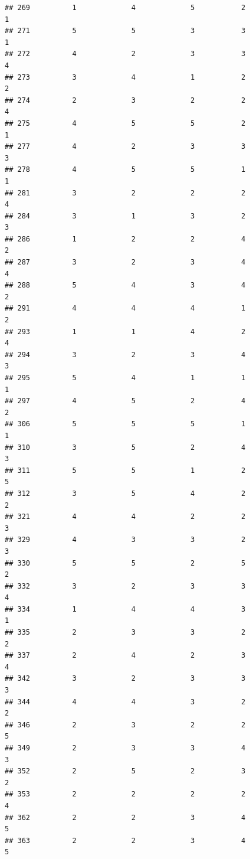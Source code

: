 \documentclass[
]{article}
\begin{document}
\begin{verbatim}
## 269          1             4             5           2             1
## 271          5             5             3           3             1
## 272          4             2             3           3             4
## 273          3             4             1           2             2
## 274          2             3             2           2             4
## 275          4             5             5           2             1
## 277          4             2             3           3             3
## 278          4             5             5           1             1
## 281          3             2             2           2             4
## 284          3             1             3           2             3
## 286          1             2             2           4             2
## 287          3             2             3           4             4
## 288          5             4             3           4             2
## 291          4             4             4           1             2
## 293          1             1             4           2             4
## 294          3             2             3           4             3
## 295          5             4             1           1             1
## 297          4             5             2           4             2
## 306          5             5             5           1             1
## 310          3             5             2           4             3
## 311          5             5             1           2             5
## 312          3             5             4           2             2
## 321          4             4             2           2             3
## 329          4             3             3           2             3
## 330          5             5             2           5             2
## 332          3             2             3           3             4
## 334          1             4             4           3             1
## 335          2             3             3           2             2
## 337          2             4             2           3             4
## 342          3             2             3           3             3
## 344          4             4             3           2             2
## 346          2             3             2           2             5
## 349          2             3             3           4             3
## 352          2             5             2           3             2
## 353          2             2             2           2             4
## 362          2             2             3           4             5
## 363          2             2             3           4             5

\end{verbatim}
\end{document}
